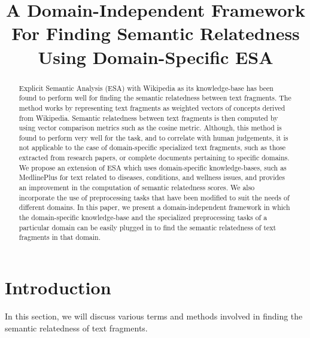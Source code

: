 \documentclass[conference]{IEEEtran}
\begin{document}
\title{A Domain-Independent Framework For Finding Semantic Relatedness Using Domain-Specific ESA}

\author{
}

\maketitle

\begin{abstract}
Explicit Semantic Analysis (ESA) with Wikipedia as its knowledge-base has been found to perform well for finding the semantic relatedness between text fragments. The method works by representing text fragments as weighted vectors of concepts derived from Wikipedia. Semantic relatedness between text fragments is then computed by using vector comparison metrics such as the cosine metric. Although, this method is found to perform very well for the task, and to correlate with human judgements, it is not applicable to the case of domain-specific specialized text fragments, such as those extracted from research papers, or complete documents pertaining to specific domains. We propose an extension of ESA which uses domain-specific knowledge-bases, such as MedlinePlus for text related to diseases, conditions, and wellness issues, and provides an improvement in the computation of semantic relatedness scores. We also incorporate the use of preprocessing tasks that have been modified to suit the needs of different domains. In this paper, we present a domain-independent framework in which the domain-specific knowledge-base and the specialized preprocessing tasks of a particular domain can be easily plugged in to find the semantic relatedness of text fragments in that domain.
\end{abstract}

\section{Introduction}
In this section, we will discuss various terms and methods involved in finding the semantic relatedness of text fragments.
\end{document}
